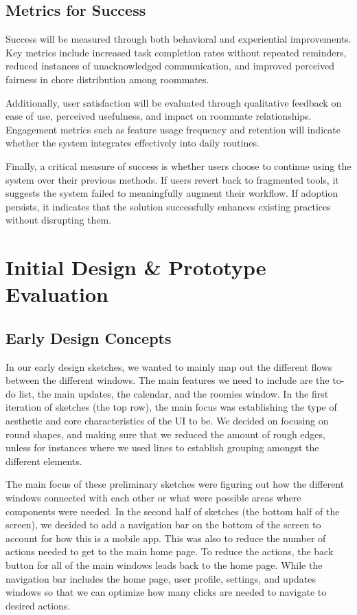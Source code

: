 \documentclass[sigconf]{acmart}
\begin{document}
\subsection{Metrics for Success}
Success will be measured through both behavioral and experiential improvements. Key metrics include increased task completion rates without repeated reminders, reduced instances of unacknowledged communication, and improved perceived fairness in chore distribution among roommates.

Additionally, user satisfaction will be evaluated through qualitative feedback on ease of use, perceived usefulness, and impact on roommate relationships. Engagement metrics such as feature usage frequency and retention will indicate whether the system integrates effectively into daily routines.

Finally, a critical measure of success is whether users choose to continue using the system over their previous methods. If users revert back to fragmented tools, it suggests the system failed to meaningfully augment their workflow. If adoption persists, it indicates that the solution successfully enhances existing practices without disrupting them.


\section{Initial Design \& Prototype Evaluation}

\subsection{Early Design Concepts}
In our early design sketches, we wanted to mainly map out the different flows between the different windows. The main features we need to include are the to-do list, the main updates, the calendar, and the roomies window. In the first iteration of sketches (the top row), the main focus was establishing the type of aesthetic and core characteristics of the UI to be. We decided on focusing on round shapes, and making sure that we reduced the amount of rough edges, unless for instances where we used lines to establish grouping amongst the different elements.

The main focus of these preliminary sketches were figuring out how the different windows connected with each other or what were possible areas where components were needed. In the second half of sketches (the bottom half of the screen), we decided to add a navigation bar on the bottom of the screen to account for how this is a mobile app. This was also to reduce the number of actions needed to get to the main home page. To reduce the actions, the back button for all of the main windows leads back to the home page. While the navigation bar includes the home page, user profile, settings, and updates windows so that we can optimize how many clicks are needed to navigate to desired actions.
\end{document}
